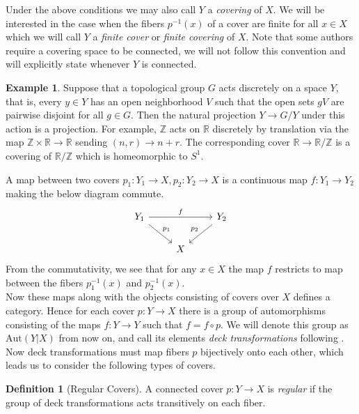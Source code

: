 \documentclass{article}
\theoremstyle{definition}
\newtheorem{definition}[theorem]{Definition}
\newtheorem{example}[theorem]{Example}
\theoremstyle{remark}
\newcommand{\R}{\mathbb{R}}
\newcommand{\Z}{\mathbb{Z}}
\begin{document}
Under the above conditions we may also call $Y$ a \textit{covering} of $X$.
We will be interested in the case when the fibers $p^{-1}(x)$ of a cover are finite for all $x \in X$ which we will call $Y$ a \textit{finite cover} or \textit{finite covering} of $X$.
Note that some authors require a covering space to be connected, we will not follow this convention and will explicitly state whenever $Y$ is connected.

\begin{example} Suppose that a topological group $G$ acts discretely on a space $Y$, that is, every $y \in Y$ has an open neighborhood $V$ such that the open sets $gV$ are pairwise disjoint for all $g  \in G$.
	Then the natural projection $Y \to G/Y$ under this action is a projection.
	For example, $\Z$ acts on $\R$ discretely by translation via the map $\Z \times \R \to \R$ sending $(n,r) \to n+r$.
	The corresponding cover $\R \to \R/\Z$ is a covering of $\R/\Z$ which is homeomorphic to $S^1$.
\end{example}

\indent A map between two covers $p_1: Y_1 \to X, p_2: Y_2 \to X$ is a continuous map $f: Y_1 \to Y_2$ making the below diagram commute.
\[\begin{tikzcd}
	{Y_1} && {Y_2} \\
	& X
	\arrow["f", from=1-1, to=1-3]
	\arrow["{p_1}", from=1-1, to=2-2]
	\arrow["{p_2}"', from=1-3, to=2-2]
\end{tikzcd}\]
From the commutativity, we see that for any $x \in X$ the map $f$ restricts to map between the fibers $p_1^{-1}(x)$ and $p_2^{-1}(x)$.\\
\indent Now these maps along with the objects consisting of covers over $X$ defines a category.
Hence for each cover $p:Y \to X$ there is a group of automorphisms consisting of the maps $f: Y \to Y$ such that $f = f \circ p$.
We will denote this group as $\text{Aut}(Y|X)$ from now on, and call its elements \textit{deck transformations} following \cite{FomenkoFuchs}.
Now deck transformations must map fibers $p$ bijectively onto each other, which leads us to consider the following types of covers.

\begin{definition}[Regular Covers]
	A connected cover $p: Y \to X$ is \textit{regular} if the group of deck transformations acts transitively on each fiber.
\end{definition}
\end{document}
